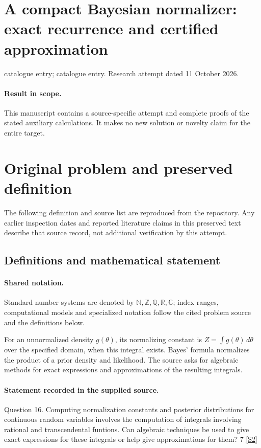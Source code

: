 \documentclass[11pt]{article}
\begin{document}
\section*{A compact Bayesian normalizer: exact recurrence and certified approximation}
\noindent catalogue entry; catalogue entry. Research attempt dated 11 October 2026.
\paragraph{Result in scope.}This manuscript contains a source-specific attempt and complete proofs of the stated auxiliary calculations. It makes no new solution or novelty claim for the entire target.
\section{Original problem and preserved definition}
The following definition and source list are reproduced from the repository. Any earlier inspection dates and reported literature claims in this preserved text describe that source record, not additional verification by this attempt.
\subsection{Definitions and mathematical statement}

\paragraph{Shared notation.}Standard number systems are denoted by $\mathbb N,\mathbb Z,\mathbb Q,\mathbb R,\mathbb C$; index ranges, computational models and specialized notation follow the cited problem source and the definitions below.


For an unnormalized density $g(\theta)$, its normalizing constant is $Z=\int g(\theta)\,d\theta$ over the specified domain, when this integral exists. Bayes' formula normalizes the product of a prior density and likelihood. The source asks for algebraic methods for exact expressions and approximations of the resulting integrals.
\paragraph{Statement recorded in the supplied source.}
Question 16. Computing normalization constants and posterior distributions for continuous random variables involves the computation of integrals involving rational and transcendental funtions. Can algebraic techniques be used to give exact expressions for these integrals or help give approximations for them? 7 \href{https://aimath.org/WWN/compalgstat/compalgstat.pdf}{[S2]}
\end{document}
